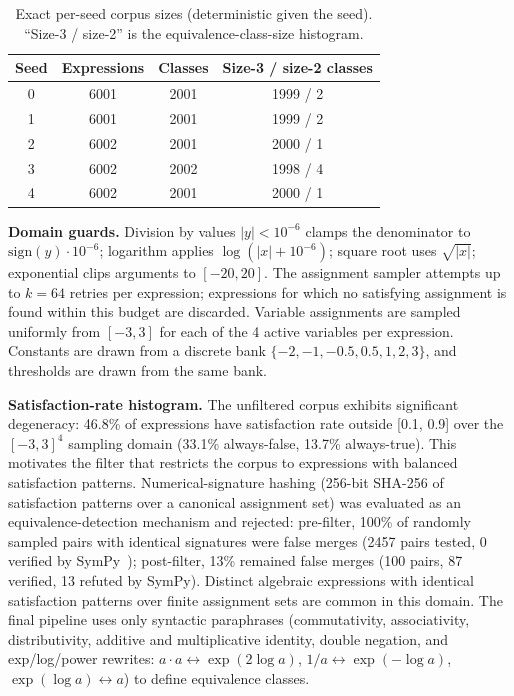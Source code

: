 \begin{table}[h]
\centering
\caption{Exact per-seed corpus sizes (deterministic given the seed). ``Size-3 / size-2'' is the equivalence-class-size histogram.}
\label{tab:corpus_sizes}
\begin{tabular}{cccc}
\toprule
Seed & Expressions & Classes & Size-3 / size-2 classes \\
\midrule
0 & 6001 & 2001 & 1999 / 2 \\
1 & 6001 & 2001 & 1999 / 2 \\
2 & 6002 & 2001 & 2000 / 1 \\
3 & 6002 & 2002 & 1998 / 4 \\
4 & 6002 & 2001 & 2000 / 1 \\
\bottomrule
\end{tabular}
\end{table}

\textbf{Domain guards.} Division by values $|y| < 10^{-6}$ clamps the denominator to $\text{sign}(y) \cdot 10^{-6}$; logarithm applies $\log(|x| + 10^{-6})$; square root uses $\sqrt{|x|}$; exponential clips arguments to $[-20, 20]$. The assignment sampler attempts up to $k=64$ retries per expression; expressions for which no satisfying assignment is found within this budget are discarded. Variable assignments are sampled uniformly from $[-3, 3]$ for each of the 4 active variables per expression. Constants are drawn from a discrete bank $\{-2, -1, -0.5, 0.5, 1, 2, 3\}$, and thresholds are drawn from the same bank.

\textbf{Satisfaction-rate histogram.} The unfiltered corpus exhibits significant degeneracy: 46.8\% of expressions have satisfaction rate outside [0.1, 0.9] over the $[-3,3]^4$ sampling domain (33.1\% always-false, 13.7\% always-true). This motivates the filter that restricts the corpus to expressions with balanced satisfaction patterns. Numerical-signature hashing (256-bit SHA-256 of satisfaction patterns over a canonical assignment set) was evaluated as an equivalence-detection mechanism and rejected: pre-filter, 100\% of randomly sampled pairs with identical signatures were false merges (2457 pairs tested, 0 verified by SymPy~\citep{meurer2017sympy}); post-filter, 13\% remained false merges (100 pairs, 87 verified, 13 refuted by SymPy). Distinct algebraic expressions with identical satisfaction patterns over finite assignment sets are common in this domain. The final pipeline uses only syntactic paraphrases (commutativity, associativity, distributivity, additive and multiplicative identity, double negation, and exp/log/power rewrites: $a \cdot a \leftrightarrow \exp(2 \log a)$, $1/a \leftrightarrow \exp(-\log a)$, $\exp(\log a) \leftrightarrow a$) to define equivalence classes.

